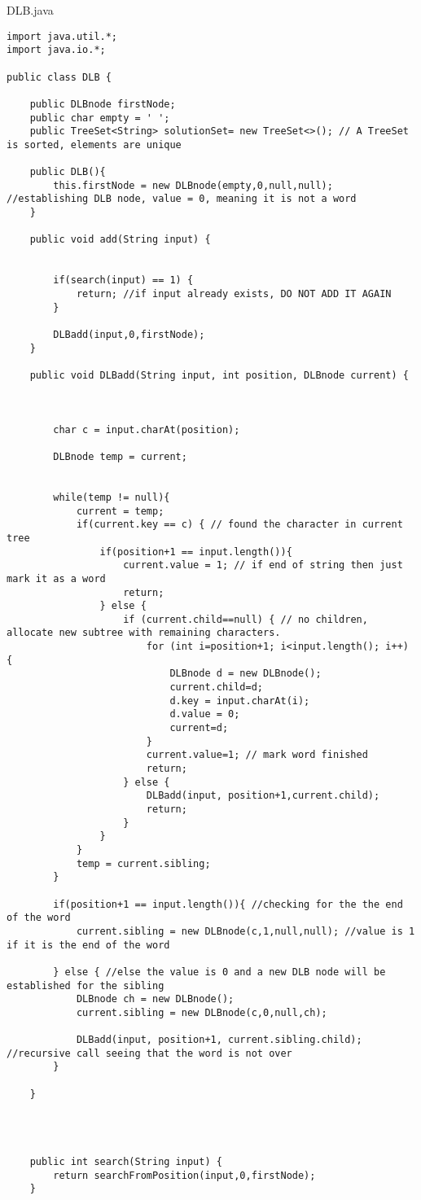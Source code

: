 \documentclass{article}
\begin{document}
DLB.java
\begin{lstlisting}
import java.util.*;
import java.io.*;

public class DLB {

	public DLBnode firstNode;
	public char empty = ' ';
    public TreeSet<String> solutionSet= new TreeSet<>(); // A TreeSet is sorted, elements are unique
	
	public DLB(){
		this.firstNode = new DLBnode(empty,0,null,null); //establishing DLB node, value = 0, meaning it is not a word
	}

	public void add(String input) {


		if(search(input) == 1) {
			return; //if input already exists, DO NOT ADD IT AGAIN
		}

		DLBadd(input,0,firstNode);
	}

	public void DLBadd(String input, int position, DLBnode current) {



		char c = input.charAt(position);

		DLBnode temp = current;


		while(temp != null){
			current = temp;
			if(current.key == c) { // found the character in current tree
				if(position+1 == input.length()){
					current.value = 1; // if end of string then just mark it as a word
					return;
				} else {
					if (current.child==null) { // no children, allocate new subtree with remaining characters.
						for (int i=position+1; i<input.length(); i++) {
							DLBnode d = new DLBnode();
							current.child=d;
							d.key = input.charAt(i);
							d.value = 0;
							current=d;
						}
						current.value=1; // mark word finished
						return;
					} else {
						DLBadd(input, position+1,current.child);
						return;
					}
				}
			}
			temp = current.sibling;
		}

		if(position+1 == input.length()){ //checking for the the end of the word
			current.sibling = new DLBnode(c,1,null,null); //value is 1 if it is the end of the word

		} else { //else the value is 0 and a new DLB node will be established for the sibling
			DLBnode ch = new DLBnode();
			current.sibling = new DLBnode(c,0,null,ch);

			DLBadd(input, position+1, current.sibling.child); //recursive call seeing that the word is not over
		}

	}




	public int search(String input) {
		return searchFromPosition(input,0,firstNode);
	}


\end{lstlisting}
\end{document}
